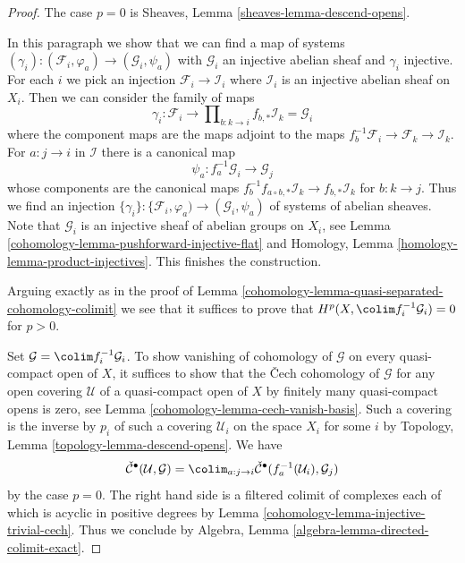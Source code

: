 \begin{proof}

The case $p = 0$ is Sheaves, Lemma \ref{sheaves-lemma-descend-opens}.

\medskip\noindent
In this paragraph we show that we can find a map of systems
$(\gamma_i) : (\mathcal{F}_i, \varphi_a) \to (\mathcal{G}_i, \psi_a)$
with $\mathcal{G}_i$ an injective abelian sheaf and $\gamma_i$ injective.
For each $i$ we pick an injection $\mathcal{F}_i \to \mathcal{I}_i$
where $\mathcal{I}_i$ is an injective abelian sheaf on $X_i$.
Then we can consider the family of maps
$$
\gamma_i :
\mathcal{F}_i
\longrightarrow
\prod\nolimits_{b : k \to i} f_{b, *}\mathcal{I}_k = \mathcal{G}_i
$$
where the component maps are the maps adjoint to the maps
$f_b^{-1}\mathcal{F}_i \to \mathcal{F}_k \to \mathcal{I}_k$.
For $a : j \to i$ in $\mathcal{I}$ there is a canonical map
$$
\psi_a : f_a^{-1}\mathcal{G}_i \to \mathcal{G}_j
$$
whose components are the canonical maps
$f_b^{-1}f_{a \circ b, *}\mathcal{I}_k \to f_{b, *}\mathcal{I}_k$
for $b : k \to j$. Thus we find an injection
$\{\gamma_i\} : \{\mathcal{F}_i, \varphi_a) \to (\mathcal{G}_i, \psi_a)$
of systems of abelian sheaves. Note that $\mathcal{G}_i$ is an injective
sheaf of abelian groups on $X_i$, see
Lemma \ref{cohomology-lemma-pushforward-injective-flat} and
Homology, Lemma \ref{homology-lemma-product-injectives}.
This finishes the construction.

\medskip\noindent
Arguing exactly as in the proof of
Lemma \ref{cohomology-lemma-quasi-separated-cohomology-colimit}
we see that it suffices to prove that
$H^p(X, \colim f_i^{-1}\mathcal{G}_i) = 0$ for $p > 0$.

\medskip\noindent
Set $\mathcal{G} = \colim f_i^{-1}\mathcal{G}_i$.
To show vanishing of cohomology of $\mathcal{G}$ on every quasi-compact
open of $X$, it suffices to show that the {\v C}ech cohomology of
$\mathcal{G}$ for any open covering $\mathcal{U}$ of a quasi-compact open of
$X$ by finitely many quasi-compact opens is zero, see
Lemma \ref{cohomology-lemma-cech-vanish-basis}.
Such a covering is the inverse by $p_i$ of such a covering $\mathcal{U}_i$
on the space $X_i$ for some $i$ by
Topology, Lemma \ref{topology-lemma-descend-opens}. We have
$$
\check{\mathcal{C}}^\bullet(\mathcal{U}, \mathcal{G}) =
\colim_{a : j \to i}
\check{\mathcal{C}}^\bullet(f_a^{-1}(\mathcal{U}_i), \mathcal{G}_j)
$$
by the case $p = 0$. The right hand side is a filtered colimit of
complexes each of which is acyclic in positive degrees by
Lemma \ref{cohomology-lemma-injective-trivial-cech}. Thus we conclude by
Algebra, Lemma \ref{algebra-lemma-directed-colimit-exact}.
\end{proof}

